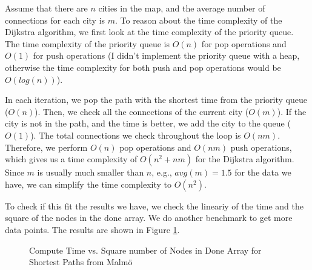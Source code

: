 \documentclass[a4paper,11pt]{article}
\begin{document}
Assume that there are $n$ cities in the map, and the average number of connections for each city is $m$.
To reason about the time complexity of the Dijkstra algorithm, 
we first look at the time complexity of the priority queue.
The time complexity of the priority queue is $O(n)$ for pop operations 
and $O(1)$ for push operations (I didn't implement the priority queue with a heap, otherwise 
the time complexity for both push and pop operations would be $O(log(n))$).

In each iteration, we pop the path with the shortest time from the priority queue ($O(n)$).
Then, we check all the connections of the current city ($O(m)$).
If the city is not in the path, and the time is better, we add the city to the queue ($O(1)$).
The total connections we check throughout the loop is $O(nm)$.
Therefore, we perform $O(n)$ pop operations and $O(nm)$ push operations, 
which gives us a time complexity of $O(n^2 + nm)$ for the Dijkstra algorithm.
Since $m$ is usually much smaller than $n$, e.g., $avg(m) = 1.5$ for the data we have,
we can simplify the time complexity to $O(n^2)$.

To check if this fit the results we have, we check the lineariy of the time and the square of the nodes in the done array.
We do another benchmark to get more data points.
The results are shown in Figure \ref{fig:compute_time_vs_nodes_square}.

\begin{figure}[H]
  \centering
  \caption{Compute Time vs. Square number of Nodes in Done Array for Shortest Paths from Malmö}
  \label{fig:compute_time_vs_nodes_square}
\end{figure}
\end{document}
